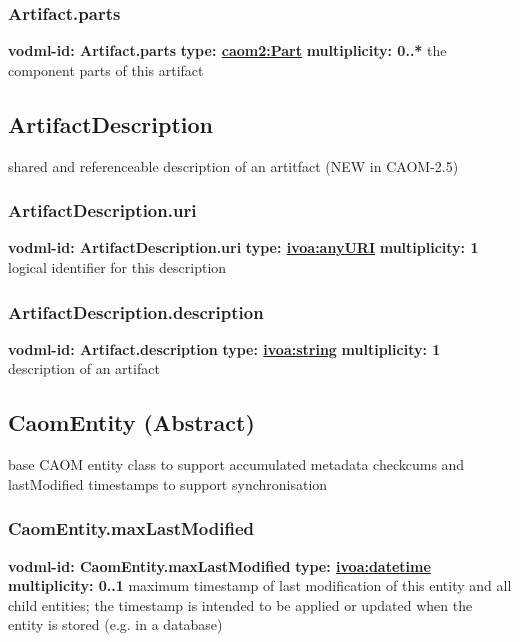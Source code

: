     \subsubsection{Artifact.parts}
      \textbf{vodml-id: Artifact.parts} \newline
      \textbf{type: \hyperref[sect:Part]{caom2:Part}} \newline
      \textbf{multiplicity: 0..*} \newline
      the component parts of this artifact

  \subsection{ArtifactDescription}
  \label{sect:ArtifactDescription}
    shared and referenceable description of an artitfact (NEW in CAOM-2.5)

    \subsubsection{ArtifactDescription.uri}
      \textbf{vodml-id: ArtifactDescription.uri} \newline
      \textbf{type: \hyperref[sect:ivoa]{ivoa:anyURI}} \newline
      \textbf{multiplicity: 1} \newline
      logical identifier for this description

    \subsubsection{ArtifactDescription.description}
      \textbf{vodml-id: Artifact.description} \newline
      \textbf{type: \hyperref[sect:ivoa]{ivoa:string}} \newline
      \textbf{multiplicity: 1} \newline
      description of an artifact

  \subsection{CaomEntity (Abstract)}
  \label{sect:CaomEntity}
    base CAOM entity class to support accumulated metadata checkcums and lastModified timestamps to support synchronisation

    \subsubsection{CaomEntity.maxLastModified}
      \textbf{vodml-id: CaomEntity.maxLastModified} \newline
      \textbf{type: \hyperref[sect:ivoa]{ivoa:datetime}} \newline
      \textbf{multiplicity: 0..1} \newline
      maximum timestamp of last modification of this entity and all child entities; the timestamp is intended to be applied or updated when the entity is stored (e.g. in a database)

